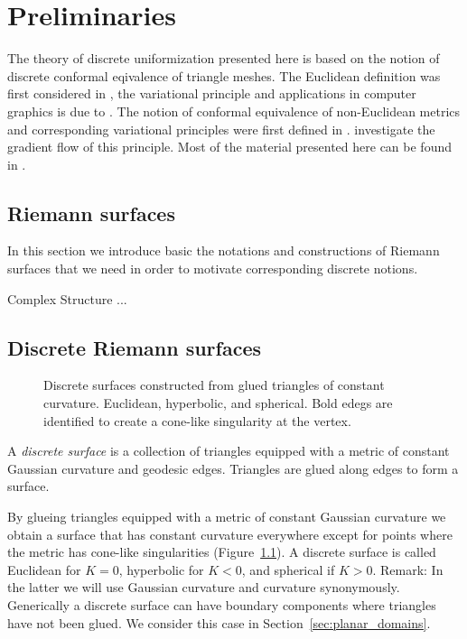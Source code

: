 \documentclass[Thesis.tex]{subfiles}
\begin{document}
\chapter{Preliminaries}

The theory of discrete uniformization presented here is based on the notion of discrete conformal eqivalence of triangle meshes. The Euclidean definition was first considered in \cite{Luo2004}, the variational principle and applications in computer graphics is due to \cite{Springborn2008, OWF2009, Bobenko2010}. The notion of conformal equivalence of non-Euclidean metrics and corresponding variational principles were first defined in \cite{Bobenko2010}. \cite{Guo2011} investigate the gradient flow of this principle.
Most of the material presented here can be found in \cite{BobSechSpr}.

\section{Riemann surfaces}

In this section we introduce basic the notations and constructions of Riemann surfaces that we 
need in order to motivate corresponding discrete notions. 

\begin{definition}{Complex Structure}
...
\end{definition}

\section{Discrete Riemann surfaces}

\begin{figure}
\centering
\scalebox{0.8}{}
\caption[Discrete surfaces from glued triangles]{Discrete surfaces constructed from glued triangles of constant curvature. Euclidean, hyperbolic, and spherical. Bold edegs are identified to create a cone-like singularity at the vertex.}
\label{fig:surface_triangles}
\end{figure}

\begin{definition}
A \emph{discrete surface} is a collection of triangles equipped with a metric of constant Gaussian curvature and geodesic edges. Triangles are glued along edges to form a surface.
\end{definition}

By glueing triangles equipped with a metric of constant Gaussian curvature we obtain a surface that has constant curvature everywhere except for points where the metric has cone-like singularities (Figure~\ref{fig:surface_triangles}). A discrete surface is called Euclidean for $K=0$, hyperbolic for $K<0$, and spherical if $K>0$.
Remark: In the latter we will use Gaussian curvature and curvature synonymously.
Generically a discrete surface can have boundary components where triangles have not been glued. We consider this case in Section~\ref{sec:planar_domains}. 
\end{document}
